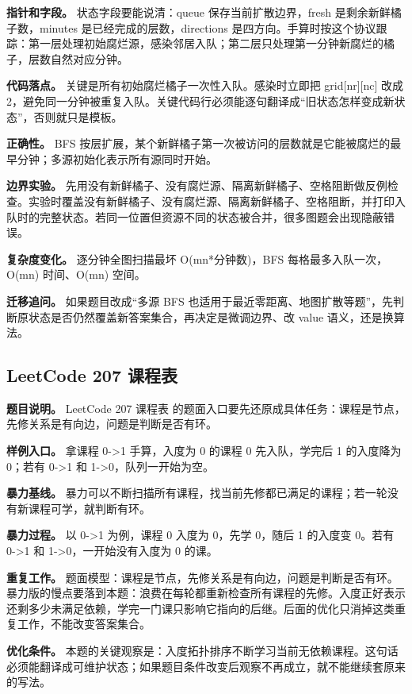 \textbf{指针和字段。} 状态字段要能说清：queue 保存当前扩散边界，fresh 是剩余新鲜橘子数，minutes 是已经完成的层数，directions 是四方向。手算时按这个协议跟踪：第一层处理初始腐烂源，感染邻居入队；第二层只处理第一分钟新腐烂的橘子，层数自然对应分钟。

\textbf{代码落点。} 关键是所有初始腐烂橘子一次性入队。感染时立即把 grid[nr][nc] 改成 2，避免同一分钟被重复入队。关键代码行必须能逐句翻译成“旧状态怎样变成新状态”，否则就只是模板。

\textbf{正确性。} BFS 按层扩展，某个新鲜橘子第一次被访问的层数就是它能被腐烂的最早分钟；多源初始化表示所有源同时开始。

\textbf{边界实验。} 先用没有新鲜橘子、没有腐烂源、隔离新鲜橘子、空格阻断做反例检查。实验时覆盖没有新鲜橘子、没有腐烂源、隔离新鲜橘子、空格阻断，并打印入队时的完整状态。若同一位置但资源不同的状态被合并，很多图题会出现隐蔽错误。

\textbf{复杂度变化。} 逐分钟全图扫描最坏 O(mn*分钟数)，BFS 每格最多入队一次，O(mn) 时间、O(mn) 空间。

\textbf{迁移追问。} 如果题目改成“多源 BFS 也适用于最近零距离、地图扩散等题”，先判断原状态是否仍然覆盖新答案集合，再决定是微调边界、改 value 语义，还是换算法。

\subsection{LeetCode 207 课程表}

\textbf{题目说明。} LeetCode 207 课程表 的题面入口要先还原成具体任务：课程是节点，先修关系是有向边，问题是判断是否有环。

\textbf{样例入口。} 拿课程 0->1 手算，入度为 0 的课程 0 先入队，学完后 1 的入度降为 0；若有 0->1 和 1->0，队列一开始为空。

\textbf{暴力基线。} 暴力可以不断扫描所有课程，找当前先修都已满足的课程；若一轮没有新课程可学，就判断有环。

\textbf{暴力过程。} 以 0->1 为例，课程 0 入度为 0，先学 0，随后 1 的入度变 0。若有 0->1 和 1->0，一开始没有入度为 0 的课。

\textbf{重复工作。} 题面模型：课程是节点，先修关系是有向边，问题是判断是否有环。暴力版的慢点要落到本题：浪费在每轮都重新检查所有课程的先修。入度正好表示还剩多少未满足依赖，学完一门课只影响它指向的后继。后面的优化只消掉这类重复工作，不能改变答案集合。

\textbf{优化条件。} 本题的关键观察是：入度拓扑排序不断学习当前无依赖课程。这句话必须能翻译成可维护状态；如果题目条件改变后观察不再成立，就不能继续套原来的写法。

